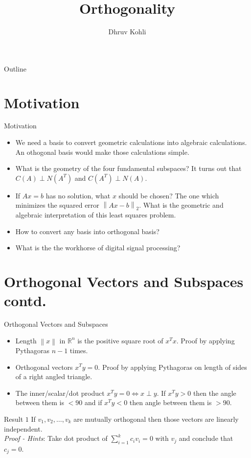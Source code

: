 \documentclass{beamer}
\title{Orthogonality}
\author{Dhruv Kohli}
\institute[Indian Institute of Technology, Guwahati] %
{
  Department of Mathematics\\
  Indian Institute of Technology, Guwahati
}
\date{}
\begin{document}
\setlength{\abovedisplayskip}{1pt}
\setlength{\belowdisplayskip}{1pt}

\begin{frame}
  \titlepage
\end{frame}

\begin{frame}{Outline}
  \tableofcontents
\end{frame}

\section{Motivation}
\begin{frame}{Motivation}{}
  \begin{itemize}
  \item {
    We need a basis to convert geometric calculations into algebraic calculations. An othogonal basis would make those calculations simple.
  }
  \item {
    What is the geometry of the four fundamental subspaces? It turns out that $C(A)\perp N(A^T)$ and $C(A^T)\perp N(A)$.
  }
  \item {
    If $Ax=b$ has no solution, what $x$ should be chosen? The one which minimizes the squared error $\left\|Ax-b\right\|_2$. What is the geometric and algebraic interpretation of this least squares problem. 
  }
  \item {
    How to convert any basis into orthogonal basis?
  }
  \item {
    What is the the workhorse of digital signal processing?
  }
  \end{itemize}
\end{frame}

\section{Orthogonal Vectors and Subspaces contd.}

\begin{frame}{Orthogonal Vectors and Subspaces}{}
\begin{itemize}
    \item Length $\left\|x\right\|$ in $\mathbb{R}^n$ is the positive square root of $x^Tx$. Proof by applying Pythagoras $n-1$ times.
    \item Orthogonal vectors $x^Ty = 0$. Proof by applying Pythagoras on length of sides of a right angled triangle.
    \item The inner/scalar/dot product $x^Ty = 0 \iff x \perp y$. If $x^Ty > 0$ then the angle between them is $<90$ and if $x^Ty < 0$ then angle between them is $>90$.
\end{itemize}
\begin{block}{Result $1$}
If $v_1, v_2, \ldots, v_k$ are mutually orthogonal then those vectors are linearly independent.\\
\textit{Proof - Hints}: Take dot product of $\sum_{i=1}^{k}c_iv_i = 0$  with $v_j$ and conclude that $c_j = 0$.
\end{block}
\end{frame}
\end{document}

